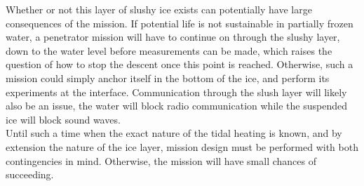 \noindent
Whether or not this layer of slushy ice exists can potentially have large consequences of the mission. If potential life is not sustainable in partially frozen water, a penetrator mission will have to continue on through the slushy layer, down to the water level before measurements can be made, which raises the question of how to stop the descent once this point is reached. Otherwise, such a mission could simply anchor itself in the bottom of the ice, and perform its experiments at the interface. Communication through the slush layer will likely also be an issue, the water will block radio communication while the suspended ice will block sound waves.\\

\noindent
Until such a time when the exact nature of the tidal heating is known, and by extension the nature of the ice layer, mission design must be performed with both contingencies in mind. Otherwise, the mission will have small chances of succeeding.